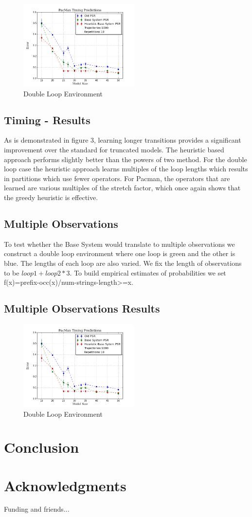 \documentclass[letterpaper]{article}
\begin{document}
\begin{figure}[ht!]
\centering
\includegraphics[width=60mm]{uCOREPICS/PacManTimingHeuristicsIncluded.png}
\caption{Double Loop Environment\label{overflow}}
\end{figure}

\subsection{Timing - Results}
As is demonstrated in figure 3, learning longer transitions provides a significant improvement over the standard for truncated models. The heuristic based approach performs slightly better than the powers of two method. For the double loop case the heuristic approach learns multiples of the loop lengths which results in partitions which use fewer operators. For Pacman, the operators that are learned are various multiples of the stretch factor, which once again shows that the greedy heuristic is effective. 

\subsection{Multiple Observations}

To test whether the Base System would translate to multiple observations we construct a double loop environment where one loop is green and the other is blue. The lengths of each loop are also varied. We fix the length of observations to be $loop1 + loop2 * 3$. To build empirical estimates of probabilities we set f(x)=prefix-occ(x)/num-strings-length>=x.

\subsection{Multiple Observations Results}

\begin{figure}[ht!]
\centering
\includegraphics[width=60mm]{uCOREPICS/PacManTimingHeuristicsIncluded.png}
\caption{Double Loop Environment\label{overflow}}
\end{figure}

\section{Conclusion}

\section{Acknowledgments}
Funding and friends...



\end{document}
